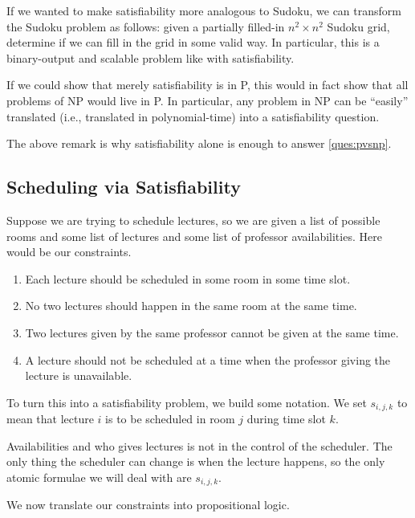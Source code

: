 \documentclass[../notes.tex]{subfiles}
\begin{document}
If we wanted to make satisfiability more analogous to Sudoku, we can transform the Sudoku problem as follows: given a partially filled-in $n^2\times n^2$ Sudoku grid, determine if we can fill in the grid in some valid way. In particular, this is a binary-output and scalable problem like with satisfiability.
\begin{remark}
	If we could show that merely satisfiability is in P, this would in fact show that all problems of NP would live in P. In particular, any problem in NP can be ``easily'' translated (i.e., translated in polynomial-time) into a satisfiability question.
\end{remark}
The above remark is why satisfiability alone is enough to answer \autoref{ques:pvsnp}.

\subsection{Scheduling via Satisfiability}
Suppose we are trying to schedule lectures, so we are given a list of possible rooms and some list of lectures and some list of professor availabilities. Here would be our constraints.
\begin{enumerate}
	\item Each lecture should be scheduled in some room in some time slot.
	\item No two lectures should happen in the same room at the same time.
	\item Two lectures given by the same professor cannot be given at the same time.
	\item A lecture should not be scheduled at a time when the professor giving the lecture is unavailable.
\end{enumerate}
To turn this into a satisfiability problem, we build some notation. We set $s_{i,j,k}$ to mean that lecture $i$ is to be scheduled in room $j$ during time slot $k$.
\begin{remark}
	Availabilities and who gives lectures is not in the control of the scheduler. The only thing the scheduler can change is when the lecture happens, so the only atomic formulae we will deal with are $s_{i,j,k}$.
\end{remark}
We now translate our constraints into propositional logic.
\end{document}
